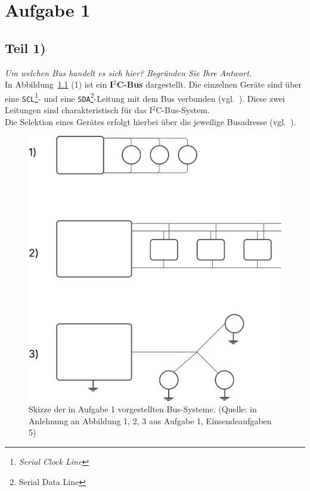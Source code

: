 \chapter{Aufgabe 1}

\section{Teil 1)}

\textit{Um welchen Bus handelt es sich hier? Begründen Sie Ihre Antwort.}\\


\noindent
In Abbildung~\ref{fig:bus} (1) ist ein \textbf{I$^2$C-Bus} dargestellt.
Die einzelnen Geräte sind über eine \texttt{SCL}\footnote{\textit{Serial Clock Line}}- und eine \texttt{SDA}\footnote{Serial Data Line}-Leitung mit dem Bus verbunden (vgl.~\cite[168]{ES4}). Diese zwei Leitungen sind charakteristisch für das I$^2$C-Bus-System.\\
Die Selektion eines Gerätes erfolgt hierbei über die jeweilige Busadresse (vgl.~\cite[170]{ES4}).


\begin{figure}
    \centering
    \includegraphics[scale=0.3]{aufgabe 1/img/bus.svg}
    \caption{Skizze der in Aufgabe 1 vorgestellten Bus-Systeme. (Quelle: in Anlehnung an Abbildung 1, 2, 3 aus Aufgabe 1, Einsendeaufgaben 5)}
    \label{fig:bus}
\end{figure}


